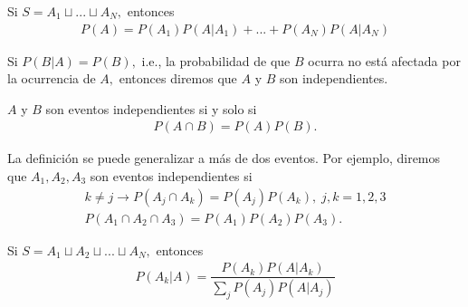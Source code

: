 {}
\begin{thm}
	\label{thm:1.10} Si $S=A_{1}\sqcup ... \sqcup A_{N},$  entonces
	\begin{align}
		\label{1.20}
		P(A)=P(A_{1})P(A|A_{1})+...+P(A_{N})P(A|A_{N})
	\end{align}
\end{thm}


{}
Si $P(B|A)=P(B),$ i.e., la probabilidad de que $B$ ocurra no está afectada por la ocurrencia de $A,$ entonces diremos que $A$ y $B$ son independientes.


\begin{defn}
	$A$ y $B$ son eventos independientes si y solo si
	\begin{align}
		\label{1.21}
		P(A \cap B) = P(A)P(B).
	\end{align}
\end{defn}


{}
La definición se puede generalizar a más de dos eventos.  Por ejemplo, diremos que $A_{1},A_{2},A_{3}$ son eventos independientes si
\begin{align}
	k\neq j \rightarrow P(A_{j} \cap A_{k})=P(A_{j})P(A_{k}), \; j,k=1,2,3 
	\\ P(A_{1}\cap A_{2} \cap A_{3})=P(A_{1})P(A_{2})P(A_{3}).
\end{align}


\begin{thm}
	Si $S=A_{1}\sqcup A_{2} \sqcup...\sqcup A_{N},$ entonces
	\begin{align}
		\label{1.24}
		P(A_{k}|A) = \dfrac{P(A_{k})P(A|A_{k})}{\sum_{j} P(A_{j})P(A|A_{j})}
	\end{align}
	
\end{thm}




